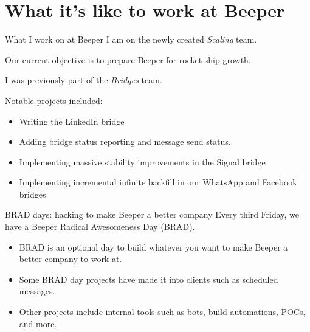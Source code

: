 \documentclass{beeper}
\begin{document}
\section{What it's like to work at Beeper}

\begin{frame}{What I work on at Beeper}
    I am on the newly created \textit{Scaling} team.

    Our current objective is to prepare Beeper for rocket-ship growth.
    \vspace{0.5cm}
    \pause

    I was previously part of the \textit{Bridges} team. 

    Notable projects included:
    \begin{itemize}
        \item Writing the LinkedIn bridge
        \item Adding bridge status reporting and message send status.
        \item Implementing massive stability improvements in the Signal bridge
        \item Implementing incremental infinite backfill in our WhatsApp and
            Facebook bridges
    \end{itemize}
\end{frame}

\begin{frame}{BRAD days: hacking to make Beeper a better company}
    Every third Friday, we have a Beeper Radical Awesomeness Day (BRAD).

    \begin{itemize}
        \item  BRAD is an optional day to build whatever you want to make Beeper
            a better company to work at.
        \item Some BRAD day projects have made it into clients such as scheduled
            messages.
        \item Other projects include internal tools such as bots, build
            automations, POCs, and more.
    \end{itemize}
\end{frame}
\end{document}
